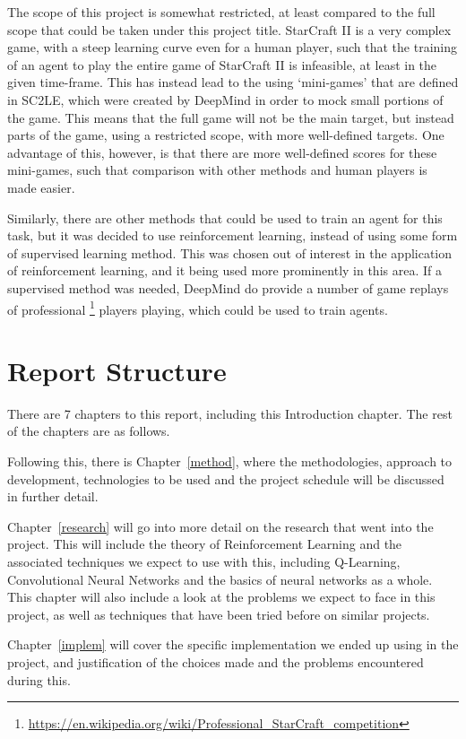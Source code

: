 The scope of this project is somewhat restricted, at least compared to the full
scope that could be taken under this project title. StarCraft II is a very complex
game, with a steep learning curve even for a human player, such that the training
of an agent to play the entire game of StarCraft II is infeasible, at least in the
given time-frame. This has instead lead to the using `mini-games' that are defined
in SC2LE, which were created by DeepMind in order to mock small portions of the
game. This means that the full game will not be the main target, but instead
parts of the game, using a restricted scope, with more well-defined targets.
One advantage of this, however, is that there are more well-defined scores for
these mini-games, such that comparison with other methods and human players is
made easier.

Similarly, there are other methods that could be used to train an agent for this
task, but it was decided to use reinforcement learning, instead of using some
form of supervised learning method. This was chosen out of interest in the
application of reinforcement learning, and it being used more prominently
in this area.
If a supervised method was needed, DeepMind
do provide a number of game replays of professional%
\footnote{\url{https://en.wikipedia.org/wiki/Professional_StarCraft_competition}}
players playing, which could
be used to train agents.

\section{Report Structure}

There are 7 chapters to this report, including this Introduction chapter.
The rest of the chapters are as follows.

Following this, there is Chapter~\ref{method}, where the methodologies,
approach to development, technologies to be used and the project
schedule will be discussed in further detail.

Chapter~\ref{research} will go into more detail on the research that went into
the project. This will include the theory of Reinforcement Learning and the
associated techniques we expect to use with this, including Q-Learning,
Convolutional Neural Networks and the basics of neural networks as a
whole. This chapter will also include a look at the problems we
expect to face in this project, as well as techniques that have been tried
before on similar projects.

Chapter~\ref{implem} will cover the specific implementation we ended up using
in the project, and justification of the choices made and the problems
encountered during this.

